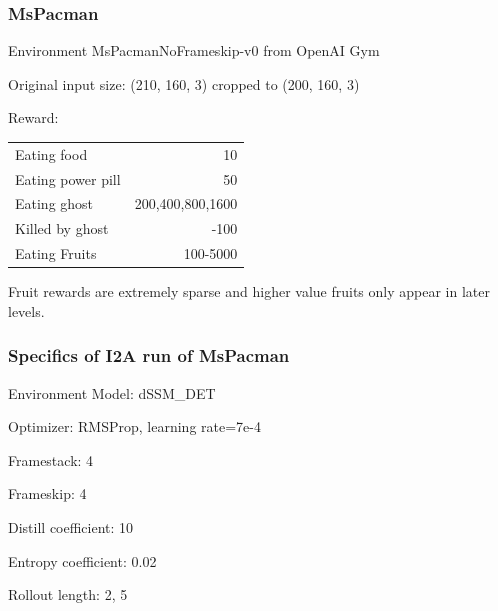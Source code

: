 \begin{frame}
	\frametitle{MsPacman}
	\begin{PraesentationAufzaehlung}
		\item Environment MsPacmanNoFrameskip-v0 from OpenAI Gym
		\item Original input size: (210, 160, 3) cropped to (200, 160, 3)
	
		\item Reward:\\
		\vspace{5mm}
		\hspace{-4mm}
		\begin{tabular}{ p{7cm}  r }
	  	Eating food & 10 \\
		Eating power pill & 50\\
		Eating ghost & 200,400,800,1600\\
		Killed by ghost & -100\\
		Eating Fruits & 100-5000\\
		\end{tabular}
		\vspace{5mm}
		\item Fruit rewards are extremely sparse and higher value fruits only appear in later levels.
	\end{PraesentationAufzaehlung}
\end{frame}

\begin{frame}
	\frametitle{Specifics of I2A run of MsPacman}
	\begin{PraesentationAufzaehlung}
		\item Environment Model: dSSM\_DET
		\item Optimizer: RMSProp, learning rate=7e-4
		\item Framestack: 4
		\item Frameskip: 4
		\item Distill coefficient: 10
		\item Entropy coefficient: 0.02
		\item Rollout length: 2, 5
	\end{PraesentationAufzaehlung}
\end{frame}


